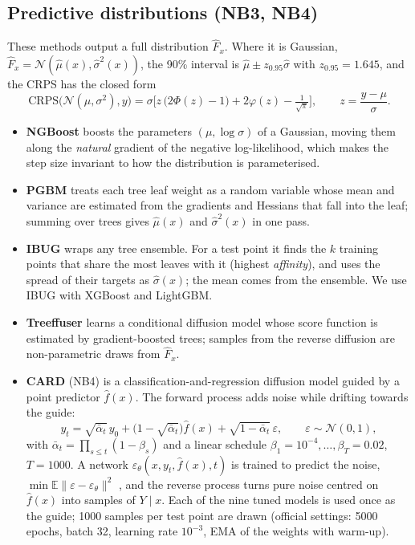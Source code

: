 \documentclass[11pt]{article}
\begin{document}
\subsection{Predictive distributions (NB3, NB4)}
These methods output a full distribution $\hat F_x$. Where it is Gaussian, $\hat F_x=\mathcal N(\hat\mu(x),\hat\sigma^2(x))$,
the 90\% interval is $\hat\mu\pm z_{0.95}\hat\sigma$ with $z_{0.95}=1.645$, and the CRPS has the closed form
\begin{equation}\label{eq:crpsgauss}
\mathrm{CRPS}\big(\mathcal N(\mu,\sigma^2),y\big)=\sigma\Big[z\,\big(2\Phi(z)-1\big)+2\varphi(z)-\tfrac{1}{\sqrt\pi}\Big],\qquad z=\frac{y-\mu}{\sigma}.
\end{equation}
\begin{itemize}
\item \textbf{NGBoost} \cite{duan2020ngboost} boosts the parameters $(\mu,\log\sigma)$ of a Gaussian, moving them along the
\emph{natural} gradient of the negative log-likelihood, which makes the step size invariant to how the distribution is
parameterised.
\item \textbf{PGBM} \cite{sprangers2021pgbm} treats each tree leaf weight as a random variable whose mean and variance
are estimated from the gradients and Hessians that fall into the leaf; summing over trees gives $\hat\mu(x)$ and
$\hat\sigma^2(x)$ in one pass.
\item \textbf{IBUG} \cite{brophy2022ibug} wraps any tree ensemble. For a test point it finds the $k$ training points that
share the most leaves with it (highest \emph{affinity}), and uses the spread of their targets as $\hat\sigma(x)$; the
mean comes from the ensemble. We use IBUG with XGBoost and LightGBM.
\item \textbf{Treeffuser} \cite{beltranvelez2024treeffuser} learns a conditional diffusion model whose score function is
estimated by gradient-boosted trees; samples from the reverse diffusion are non-parametric draws from $\hat F_x$.
\item \textbf{CARD} \cite{han2022card} (NB4) is a classification-and-regression diffusion model guided by a point predictor
$\hat f(x)$. The forward process adds noise while drifting towards the guide:
\begin{equation}
y_t=\sqrt{\bar\alpha_t}\,y_0+\big(1-\sqrt{\bar\alpha_t}\big)\hat f(x)+\sqrt{1-\bar\alpha_t}\,\varepsilon,\qquad\varepsilon\sim\mathcal N(0,1),
\end{equation}
with $\bar\alpha_t=\prod_{s\le t}(1-\beta_s)$ and a linear schedule $\beta_1=10^{-4},\dots,\beta_T=0.02$, $T=1000$. A network
$\varepsilon_\theta(x,y_t,\hat f(x),t)$ is trained to predict the noise, $\min\mathbb E\|\varepsilon-\varepsilon_\theta\|^2$
\cite{ho2020ddpm}, and the reverse process turns pure noise centred on $\hat f(x)$ into samples of $Y\mid x$. Each of the
nine tuned models is used once as the guide; 1000 samples per test point are drawn (official settings: 5000 epochs,
batch 32, learning rate $10^{-3}$, EMA of the weights with warm-up).
\end{itemize}
\end{document}
